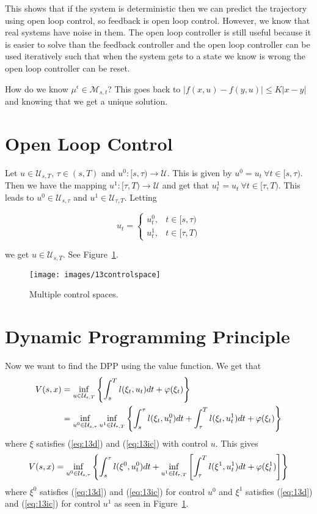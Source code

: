 This shows that if the system is deterministic then we can predict the trajectory using open loop control, so feedback is open loop control.
However, we know that real systems have noise in them.
The open loop controller is still useful because it is easier to solve than the feedback controller and the open loop controller can be used iteratively such that when the system gets to a state we know is wrong the open loop controller can be reset.

How do we know $\mu^\epsilon\in\mathcal{M}_{s,t}$? This goes back to $|f(x,u)-f(y,u)|\leq K|x-y|$ and knowing that we get a unique solution.

\section{Open Loop Control}
Let $u\in\mathcal{U}_{s,T}$, $\tau\in(s,T)$ and $u^0:[s,\tau)\to\mathcal{U}$.%
This is given by $u^0=u_t~\forall t\in[s,\tau)$.%
Then we have the mapping $u^1: [\tau,T)\to\mathcal{U}$ and get that $u^1_t=u_t~\forall t\in[\tau,T)$.%
This leads to $u^0\in\mathcal{U}_{s,\tau}$ and $u^1\in\mathcal{U}_{\tau,T}$.
Letting

\begin{equation*}
u_t=\begin{cases} u_t^0, & t\in[s,\tau) \\ u_t^1, & t\in[\tau,T) \end{cases}%
\end{equation*}

we get $u\in\mathcal{U}_{s,T}$.
See Figure~\ref{fig:13controlspace}.

\begin{figure}[ht!]
\centering
\texttt{[image: images/13controlspace]}
\caption{Multiple control spaces.}%
\label{fig:13controlspace}
\end{figure}

\section{Dynamic Programming Principle}
Now we want to find the DPP using the value function.
We get that
\begin{align*}
V(s,x) &= \inf_{u\in\mathcal{U}_{s,T}} \left\lbrace \int_s^T l(\xi_t,u_t)dt + \varphi(\xi_t) \right\rbrace \\
&= \inf_{u^0\in\mathcal{U}_{s,\tau}} \inf_{u^1\in\mathcal{U}_{\tau,T}} \left\lbrace \int_s^\tau l(\xi_t,u_t^0)dt + \int_\tau^T l(\xi_t,u_t^1)dt + \varphi(\xi_t) \right\rbrace
\end{align*}
where $\xi$ satisfies (\ref{eq:13d}) and (\ref{eq:13ic}) with control $u$.
This gives
\begin{align*}
V(s,x) = \inf_{u^0\in\mathcal{U}_{s,\tau}} \left\lbrace \int_s^\tau l(\xi^0,u_t^0)dt + \inf_{u^1\in\mathcal{U}_{\tau,T}} \left[\int_\tau^T l(\xi^1,u_t^1)dt + \varphi(\xi_t^1)\right]\right\rbrace
\end{align*}
where $\xi^0$ satisfies (\ref{eq:13d}) and (\ref{eq:13ic}) for control $u^0$ and $\xi^1$ satisfies (\ref{eq:13d}) and (\ref{eq:13ic}) for control $u^1$ as seen in Figure~\ref{fig:13controlspace}.

